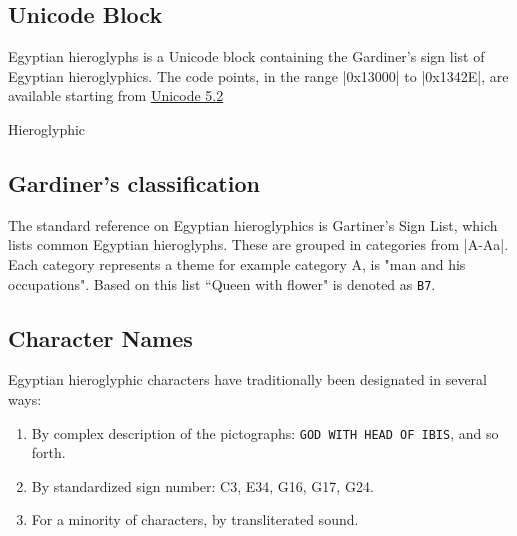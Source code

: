 \ifluatex
\bgroup
\centering 
\aegyptus
\scalebox{7}{\char"F300C}
\scalebox{7}{\char"F3001}
\scalebox{7}{\char"F3010}
\scalebox{7}{\char"F308B}
\scalebox{7}{\char"F3097}
\scalebox{7}{\char"F3091}
\egroup

\fi


\subsection{Unicode Block}

Egyptian hieroglyphs is a Unicode block containing the Gardiner's sign list of Egyptian hieroglyphics.
The code points, in the range |0x13000| to |0x1342E|, are available starting from
\href{http://unicode.org/charts/PDF/U13000.pdf}{Unicode 5.2}

\begin{scriptexample}[]{Hieroglyphic}
\bgroup
{}
\egroup
\end{scriptexample}

\subsection{Gardiner's classification}

The standard reference on Egyptian hieroglyphics is Gartiner's Sign List, which lists common Egyptian hieroglyphs. These are grouped in categories from |A-Aa|. Each category represents a theme for example category A, is "man and his occupations". Based on this list ``Queen with flower" is denoted as \texttt{B7}. 

\subsection{Character Names} 

Egyptian hieroglyphic characters have traditionally been designated in
several ways:

\begin{enumerate}
\item  By complex description of the pictographs: \texttt{GOD WITH HEAD OF IBIS}, and so forth.
\item By standardized sign number: C3, E34, G16, G17, G24.
\item For a minority of characters, by transliterated sound.
\end{enumerate}

